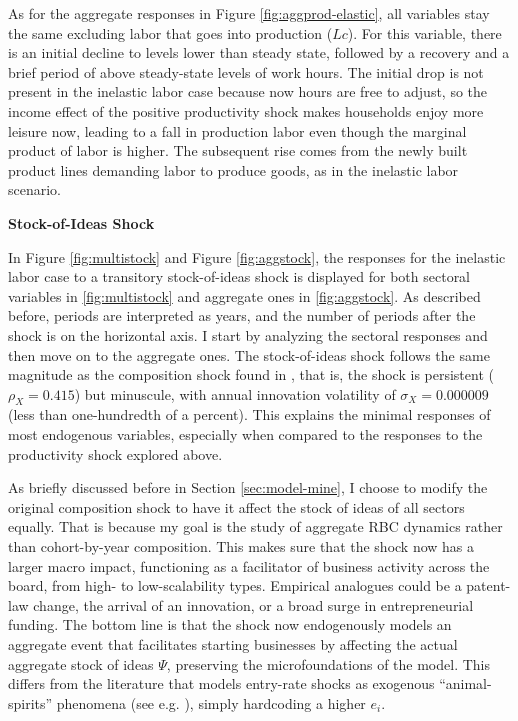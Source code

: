 \documentclass[a4paper,12pt]{article} %
\numberwithin{equation}{section} %
\numberwithin{figure}{section}
\numberwithin{table}{section}
\begin{document}
As for the aggregate
responses in Figure \ref{fig:aggprod-elastic}, all variables stay the same excluding labor that goes into production ($Lc$). For this variable, there
is an initial decline to levels lower than steady state, followed by a recovery and a brief period of above steady-state levels of work hours. 
The initial drop is not present in the inelastic labor case because now hours are free to adjust, so the income effect of the positive 
productivity shock makes households enjoy more leisure now, leading to a fall in production labor even though the marginal product of 
labor is higher. The subsequent rise comes from  the newly built product lines demanding labor to produce goods, as in the 
inelastic labor scenario.



\medskip
\medskip
\noindent\textbf{Stock-of-Ideas Shock}
\medskip

In Figure \ref{fig:multistock} and Figure \ref{fig:aggstock}, the responses for the inelastic labor case
to a transitory stock-of-ideas shock is displayed for both sectoral variables in 
\ref{fig:multistock} and aggregate ones in \ref{fig:aggstock}. As described before, periods are interpreted as years,
and the number of periods after the shock is on the horizontal axis. I start by analyzing the sectoral responses and
then move on to the aggregate ones. The stock-of-ideas shock follows the same magnitude as the composition shock found in
\textcite{sedlavcek2017growth}, that is, the shock is persistent ($\rho_X = 0.415$) but minuscule, with annual
innovation volatility of $\sigma_X = 0.000009$ (less than one-hundredth of a percent). This explains the minimal responses of
most endogenous variables, especially when compared to the responses to the productivity shock explored above.

As briefly discussed before in Section \ref{sec:model-mine}, I choose to modify the original composition shock to have it affect the
stock of ideas of all sectors equally. That is because my goal is the study of aggregate RBC dynamics rather than cohort-by-year composition.
This makes sure that the shock now has a larger macro impact, functioning as a facilitator of business activity across the board, from high- 
to low-scalability types. Empirical analogues could be a patent-law change, the arrival of an innovation, or a broad surge in entrepreneurial 
funding. The bottom line is that the shock now endogenously models an aggregate event that facilitates starting businesses by affecting
the actual aggregate stock of ideas $\Psi$, preserving the microfoundations of the model. This differs from the literature that models entry-rate
shocks as exogenous ``animal-spirits'' phenomena (see e.g. \cite{leduc2016uncertainty}), simply hardcoding a higher $e_i$.
\end{document}
